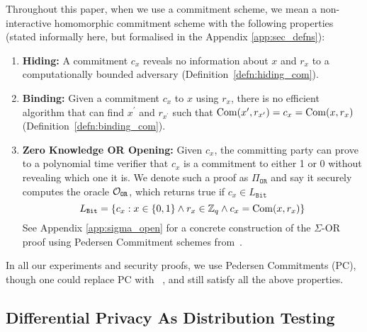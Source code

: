 
Throughout this paper, when we use a commitment scheme, we mean a non-interactive homomorphic commitment scheme  with the following properties (stated informally here, but formalised in the Appendix \ref{app:sec_defns}): 

\begin{enumerate}
    \item{\textbf{Hiding:}  A commitment $c_x$ reveals no information about $x$ and $r_x$ to a computationally bounded adversary (Definition~\ref{defn:hiding_com}).}

    \item{\textbf{Binding:} Given a commitment $c_x$ to $x$ using $r_x$, there is no efficient algorithm that can find $x^\prime$ and $r_{x^\prime}$ such that $\operatorname{Com}(x^\prime, r_{x^\prime}) = c_x = \operatorname{Com}(x, r_{x})$ (Definition~\ref{defn:binding_com}).}

    \item{\textbf{Zero Knowledge OR Opening:} Given $c_x$, the committing party can prove to a polynomial time verifier that $c_x$ is a commitment to either 1 or 0 without revealing which one it is. We denote such a proof as $\Pi_{\texttt{OR}}$ and say it securely computes the oracle $\mathcal{O}_{\texttt{OR}}$, which returns true if $c_x \in L_{\texttt{Bit}}$ 
    \begin{equation}
        L_{\texttt{Bit}} = \{c_x: x \in \{ 0, 1\} \land  r_x \in \mathbb{Z}_q \land c_x = \operatorname{Com}(x, r_x) \}
    \end{equation}
    See Appendix \ref{app:sigma_open} for a concrete construction of the $\Sigma$-OR proof using Pedersen Commitment schemes from~\cite{damgaard2000efficient}.
    }
\end{enumerate}

In all our experiments and security proofs, we use Pedersen Commitments (PC), though one could replace PC with ~\cite{weng2021wolverine, dittmer2020line, baum2021mathsf}, and still satisfy all the above properties.

\subsection{Differential Privacy As Distribution Testing}

